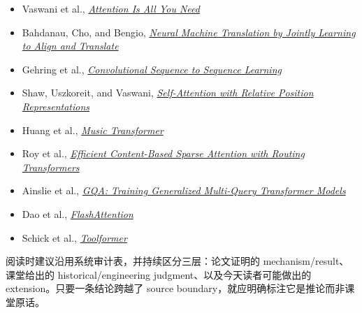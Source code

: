 \begingroup
\footnotesize
\begin{itemize}[itemsep=0pt,topsep=0.15em,parsep=0pt]
  \item Vaswani et al., \href{https://arxiv.org/abs/1706.03762}{\emph{Attention Is All You Need}}
  \item Bahdanau, Cho, and Bengio, \href{https://arxiv.org/abs/1409.0473}{\emph{Neural Machine Translation by Jointly Learning to Align and Translate}}
  \item Gehring et al., \href{https://arxiv.org/abs/1705.03122}{\emph{Convolutional Sequence to Sequence Learning}}
  \item Shaw, Uszkoreit, and Vaswani, \href{https://arxiv.org/abs/1803.02155}{\emph{Self-Attention with Relative Position Representations}}
  \item Huang et al., \href{https://arxiv.org/abs/1809.04281}{\emph{Music Transformer}}
  \item Roy et al., \href{https://arxiv.org/abs/2003.05997}{\emph{Efficient Content-Based Sparse Attention with Routing Transformers}}
  \item Ainslie et al., \href{https://arxiv.org/abs/2305.13245}{\emph{GQA: Training Generalized Multi-Query Transformer Models}}
  \item Dao et al., \href{https://arxiv.org/abs/2205.14135}{\emph{FlashAttention}}
  \item Schick et al., \href{https://arxiv.org/abs/2302.04761}{\emph{Toolformer}}
\end{itemize}

阅读时建议沿用系统审计表，并持续区分三层：论文证明的 mechanism/result、课堂给出的 historical/engineering judgment、以及今天读者可能做出的 extension。只要一条结论跨越了 source boundary，就应明确标注它是推论而非课堂原话。
\endgroup



